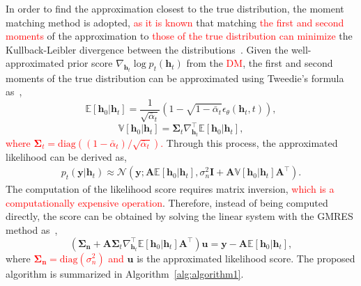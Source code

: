 \documentclass[lettersize,journal]{IEEEtran}
\newcommand{\tred}{\textcolor{red}}
\begin{document}
In order to find the approximation closest to the true distribution, the moment matching method is adopted, \tred{as it is known} that matching \tred{the first and second moments} of the approximation to \tred{those of the true distribution can minimize} the Kullback-Leibler divergence between the distributions~\cite{bishopPatternRecognitionMachine2006}.
Given the well-approximated prior score $\nabla_{\mathbf{h}_{t}}\log p_{t}(\mathbf{h}_{t})$ from the \tred{DM}, the first and second moments of the true distribution can be approximated using Tweedie's formula as~\cite{efronTweediesFormulaSelection2011},
\begin{equation}
\mathbb{E}[\mathbf{h}_{0}|\mathbf{h}_{t}] = \frac{1}{\sqrt{ \bar{\alpha}_{t} }}(1-\sqrt{ 1-\bar{\alpha}_{t} }\epsilon_{\theta}(\mathbf{h}_{t},t)),
\end{equation}
\begin{equation}
\mathbb{V}[\mathbf{h}_{0}|\mathbf{h}_{t}] = \boldsymbol{\Sigma}_{t}\nabla_{\mathbf{h}_{t}}^{\top}\mathbb{E}[\mathbf{h}_{0}|\mathbf{h}_{t}],
\end{equation}
\tred{where $\boldsymbol{\Sigma}_{t} = \text{diag}((1-\bar{\alpha}_{t}) / \sqrt{ \bar{\alpha}_{t} })$.} Through this process, the approximated likelihood can be derived as,
\begin{equation}
\begin{aligned}
p_{t}(\mathbf{y}|\mathbf{h}_{t}) \approx \mathcal{N}(\mathbf{y}; \mathbf{A}\mathbb{E}[\mathbf{h}_{0}|\mathbf{h}_{t}], \sigma_{n}^{2}\mathbf{I}+\mathbf{A}\mathbb{V}[\mathbf{h}_{0}|\mathbf{h}_{t}]\mathbf{A}^{\top}).
\end{aligned}
\end{equation}
The computation of the likelihood score requires matrix inversion, \tred{which is a computationally expensive operation}. Therefore, instead of being computed directly, the score can be obtained by solving the linear system with the GMRES method as~\cite{saadGMRESGeneralizedMinimal1986},
\begin{equation}
(\boldsymbol{\Sigma}_{\mathbf{n}}+\mathbf{A}\boldsymbol{\Sigma}_{t}\nabla_{\mathbf{h}_{t}}^{\top}\mathbb{E}[\mathbf{h}_{0}|\mathbf{h}_{t}]\mathbf{A}^{\top})\mathbf{u} = \mathbf{y}- \mathbf{A}\mathbb{E}[\mathbf{h}_{0}|\mathbf{h}_{t}],
\end{equation}
where \tred{$\boldsymbol{\Sigma}_{\mathbf{n}} = \text{diag}(\sigma_{n}^{2})$ and} $\mathbf{u}$ is the approximated likelihood score. The proposed algorithm is summarized in Algorithm~\ref{alg:algorithm1}.
\end{document}

